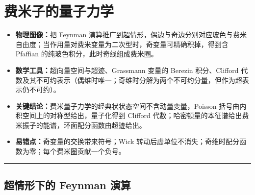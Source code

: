 \section{费米子的量子力学}

\begin{keytakeaways}
\begin{itemize}
  \item \textbf{物理图像：}把 Feynman 演算推广到超情形，偶边与奇边分别对应玻色与费米自由度；当作用量对费米变量为二次型时，奇变量可精确积掉，得到含 Pfaffian 的纯玻色积分，此时奇线组成费米圈。
  \item \textbf{数学工具：}超向量空间与超迹、Grassmann 变量的 Berezin 积分、Clifford 代数及其不可约表示（偶维时唯一；奇维时分解为两个不可约分量，但作为超表示仍不可约）。
  \item \textbf{关键结论：}费米量子力学的经典状状态空间不含动量变量，Poisson 括号由内积空间上的对称型给出，量子化得到 Clifford 代数；哈密顿量的本征谱给出费米振子的能谱，环面配分函数由超迹给出。
  \item \textbf{易错点：}奇变量的交换带来符号；Wick 转动后虚单位不消失；奇维时配分函数为零；每个费米圈贡献一个负号。
\end{itemize}
\end{keytakeaways}

\bigskip
\noindent\rule{\textwidth}{0.6pt}
\bigskip

\subsection{超情形下的 Feynman 演算}

